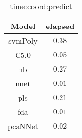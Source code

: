 \begin{table}[!ht]
	\centering
	\begin{tabular}{|c|c|}
		\hline
		Model & elapsed \\ \hline
		svmPoly & $0.38$ \\ \hline
		C5.0 & $0.05$ \\ \hline
		nb & $0.27$ \\ \hline
		nnet & $0.01$ \\ \hline
		pls & $0.21$ \\ \hline
		fda & $0.01$ \\ \hline
		pcaNNet & $0.02$ \\ \hline
	\end{tabular}
	\caption{time:coord:predict}
	\label{tab:time:coord:predict}
\end{table}
